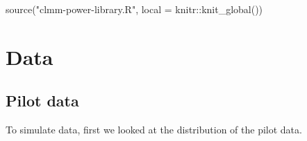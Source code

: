 \documentclass[
  bookmarksnumbered]{article}
\newenvironment{Shaded}{\begin{snugshade}}{\end{snugshade}}
\newcommand{\AttributeTok}[1]{\textcolor[rgb]{0.80,0.80,0.80}{#1}}
\newcommand{\FunctionTok}[1]{\textcolor[rgb]{0.94,0.94,0.56}{#1}}
\newcommand{\NormalTok}[1]{\textcolor[rgb]{0.80,0.80,0.80}{#1}}
\newcommand{\SpecialCharTok}[1]{\textcolor[rgb]{0.86,0.64,0.64}{#1}}
\newcommand{\StringTok}[1]{\textcolor[rgb]{0.80,0.58,0.58}{#1}}
\begin{document}
\begin{Shaded}
\begin{Highlighting}[]
\FunctionTok{source}\NormalTok{(}\StringTok{"clmm{-}power{-}library.R"}\NormalTok{, }\AttributeTok{local =}\NormalTok{ knitr}\SpecialCharTok{::}\FunctionTok{knit\_global}\NormalTok{())}
\end{Highlighting}
\end{Shaded}

\hypertarget{data}{%
\section{Data}\label{data}}

\hypertarget{pilot-data}{%
\subsection{Pilot data}\label{pilot-data}}

To simulate data, first we looked at the distribution of the pilot data.
\end{document}
